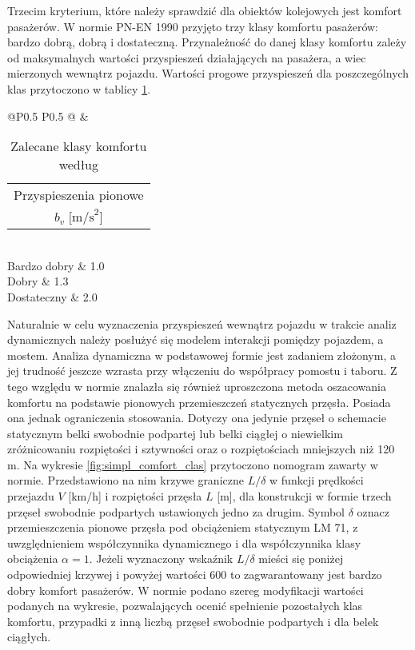 Trzecim kryterium, które należy sprawdzić dla obiektów kolejowych jest komfort pasażerów. W normie PN-EN 1990 przyjęto trzy klasy komfortu pasażerów: bardzo dobrą, dobrą i dostateczną. Przynależność do danej klasy komfortu zależy od maksymalnych wartości przyspieszeń działających na pasażera, a wiec mierzonych wewnątrz pojazdu. Wartości progowe przyspieszeń dla poszczególnych klas przytoczono w tablicy \ref{tab:comfort_classes}. 
\begin{table}[hbt!]
	\caption{Zalecane klasy komfortu według \parencite{PKNc}}
	\footnotesize
	\setlength\tabcolsep{0pt}
	\centering
	\begin{tabular}{@{}P{0.5\textwidth} P{0.5\textwidth} @{}}
		\toprule
		 & \begin{tabular}[c]{@{}c@{}}Przyspieszenia pionowe\\ $b_v \;\text{[m/s}^2\text{]}$\end{tabular} \\ \midrule
		Bardzo dobry                        & 1.0                                                                                         \\ %
		Dobry                               & 1.3                                                                                         \\ %
		Dostateczny                         & 2.0                                                                                         \\  \bottomrule
	\end{tabular}
	\label{tab:comfort_classes}
\end{table}
Naturalnie w celu wyznaczenia przyspieszeń wewnątrz pojazdu w trakcie analiz dynamicznych należy posłużyć się modelem interakcji pomiędzy pojazdem, a mostem. Analiza dynamiczna w podstawowej formie jest zadaniem złożonym, a jej trudność jeszcze wzrasta przy włączeniu do współpracy pomostu i taboru. Z tego względu w normie znalazła się również uproszczona metoda oszacowania komfortu na podstawie pionowych przemieszczeń statycznych przęsła. Posiada ona jednak ograniczenia stosowania. Dotyczy ona jedynie przęseł o schemacie statycznym belki swobodnie podpartej lub belki ciągłej o niewielkim zróżnicowaniu rozpiętości i sztywności oraz o rozpiętościach mniejszych niż 120 m. Na wykresie \ref{fig:simpl_comfort_clas} przytoczono nomogram zawarty w normie. Przedstawiono na nim krzywe graniczne $L/\delta$ w funkcji prędkości przejazdu $V $ [km/h] i rozpiętości przęsła $L$ [m], dla konstrukcji w formie trzech przęseł swobodnie podpartych ustawionych jedno za drugim. Symbol $\delta$ oznacz przemieszczenia pionowe przęsła pod obciążeniem statycznym LM 71, z uwzględnieniem współczynnika dynamicznego i dla współczynnika klasy obciążenia $\alpha =1$. Jeżeli wyznaczony wskaźnik $L/\delta$ mieści się poniżej odpowiedniej krzywej i powyżej wartości 600 to zagwarantowany jest bardzo dobry komfort pasażerów. W normie podano szereg modyfikacji wartości podanych na wykresie, pozwalających ocenić spełnienie pozostałych klas komfortu, przypadki z inną liczbą przęseł swobodnie podpartych i dla belek ciągłych.

